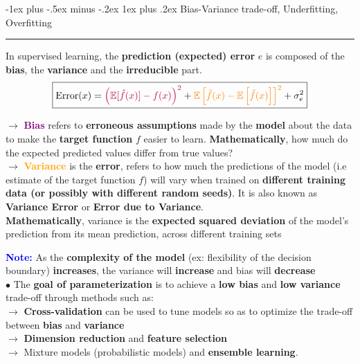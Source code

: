 \documentclass[letterpaper, 10.5pt,landscape]{article}
\makeatletter
\def\mathcolor#1#{\@mathcolor{#1}}
\def\@mathcolor#1#2#3{%
  \protect\leavevmode
  \begingroup
    \color#1{#2}#3%
  \endgroup
}
\renewcommand{\subsubsection}{\@startsection{subsubsection}{3}{0mm}%
                                {-1ex plus -.5ex minus -.2ex}%
                                {1ex plus .2ex}%
                                {\normalfont\small\bfseries}}
\makeatother
\begin{document}
\begin{multicols*}{3}
\subsubsection{Bias-Variance trade-off, Underfitting, Overfitting} {\color{teal}\hrule height 0.5pt} \smallskip

In supervised learning, the \textbf{prediction (expected) error} $e$ is composed of the \textbf{bias}, the \textbf{variance} and the \textbf{irreducible} part.  
\vspace{-3pt}
\[\boxed{\text{Error}(x) =  \mathcolor{purple}{\left(\mathbb{E}[\hat{f}(x)] - f(x)\right)^{2}} + \mathcolor{orange}{\mathbb{E} \left[\hat{f}(x)- \mathbb{E}\left[\hat{f}(x)\right] \right]^{2}} + \sigma^{2}_{e}}\]
\vspace{-5pt}

$\rightarrow$ \textbf{\textcolor{purple}{Bias}} refers to \textbf{erroneous assumptions} made by the \textbf{model} about the data to make the \textbf{target function} $f$ easier to learn. \textbf{Mathematically}, how much do the expected predicted values differ from true values?
\\
$\rightarrow$ \textbf{\textcolor{orange}{Variance}} is the \textbf{error}, refers to how much the predictions of the model (i.e estimate of the target function $f$) will vary when trained on \textbf{different training data (or possibly with different random seeds)}. It is also known as \textbf{Variance Error} or \textbf{Error due to Variance}. \\

\textbf{Mathematically}, variance is the \textbf{expected squared deviation} of the model's prediction from its mean prediction, across different training sets

\vspace{3pt}
\textbf{\textcolor{blue}{Note:}} As the \textbf{complexity of the model} (ex: flexibility of the decision boundary) \textbf{increases}, the variance will \textbf{increase} and bias will \textbf{decrease}  \\

\vspace{3pt}
$\bullet$ The \textbf{goal of parameterization} is to achieve a \textbf{low bias} and \textbf{low variance} trade-off through methods such as:\\
$\rightarrow$ \textbf{Cross-validation} can be used to tune models so as to optimize the trade-off  between \textbf{bias} and \textbf{variance}\\
$\rightarrow$ \textbf{Dimension reduction} and \textbf{feature selection} \\
$\rightarrow$ Mixture models (probabilistic models) and \textbf{ensemble learning}. \\


\end{multicols*}
\end{document}
